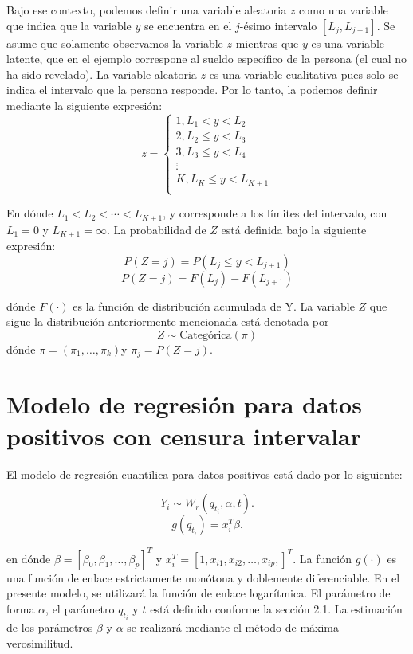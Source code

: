 \documentclass{report}
\begin{document}
Bajo ese contexto, podemos definir una variable aleatoria $z$ como una variable que indica que la variable $y$ se encuentra en el $j$-ésimo intervalo $[L_{j},L_{j+1}]$. Se asume que solamente observamos la variable $z$ mientras que $y$ es una variable latente, que en el ejemplo correspone al sueldo específico de la persona (el cual no ha sido revelado). La variable aleatoria $z$ es una variable cualitativa pues solo se indica el intervalo que la persona responde. Por lo tanto, la podemos definir mediante la siguiente expresión:
\begin{equation}
z = 
	\begin{cases}
		1, L_{1}< y < L_{2} \\
		2, L_{2} \leq y < L_{3} \\
		3, L_{3} \leq y < L_{4} \\
		\vdots \\
		K, L_{K} \leq y < L_{K+1} \\
	\end{cases}
\end{equation}

En dónde $L_1 < L_2 < \cdots < L_{K+1}$, y corresponde a los límites del intervalo, con $L_{1}=0$ y $L_{K+1}=\infty$. La probabilidad de $Z$ está definida bajo la siguiente expresión:
\[P\left( Z=j \right)=P\left(L_{j} \leq y < L_{j+1} \right)\]
\[P\left( Z=j \right)=F\left( L_{j} \right)-F\left( L_{j+1} \right)\]

\noindent dónde $F(\cdot)$ es la función de distribución acumulada de Y. La variable $Z$ que sigue la distribución anteriormente mencionada está denotada por 
$$Z \sim \text{Categórica}(\pi)$$
\noindent dónde $\pi=\left( \pi_{1},\dots,\pi_{k}\right)$y $\pi_{j}=P(Z=j)$.

\section{Modelo de regresión para datos positivos con censura intervalar}

El modelo de regresión cuantílica para datos positivos está dado por lo siguiente:

\[Y_{i} \sim W_{r}\left( q_{t_{i}},\alpha,t \right).\]
\[g\left( q_{t_{i}} \right) = x_{i}^{T}\beta.\]

\noindent en dónde $\beta=\left[ \beta_0,\beta_{1},\dots,\beta_{p} \right]^{T}$ y $x_{i}^{T} =\left[ 1,x_{i1},x_{i2},\dots,x_{ip}, \right]^{T}$. La función $g(\cdot)$ es una función de enlace estrictamente monótona y doblemente diferenciable. En el presente modelo, se utilizará la función de enlace logarítmica. El parámetro de forma $\alpha$, el parámetro $q_{t_{i}}$ y $t$ está definido conforme la sección 2.1. La estimación de los parámetros $\beta$ y $\alpha$ se realizará mediante el método de máxima verosimilitud.
\end{document}
